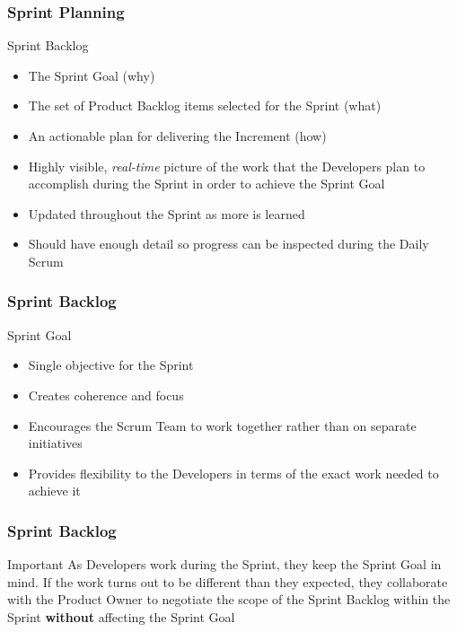 \begin{frame}
    \frametitle{Sprint Planning}
    \begin{block}{Sprint Backlog}
        \begin{itemize}
            \setlength\itemsep{0.7em}
            \item The Sprint Goal (why)
            \item The set of Product Backlog items selected for the Sprint (what)
            \item An actionable plan for delivering the Increment (how)
        \end{itemize}
    \end{block}
     {
        \vspace{0.2em}
        \begin{itemize}
            \setlength\itemsep{0.7em}
            \item Highly visible, \textit{real-time} picture of the work that the Developers plan to accomplish during the Sprint in order to achieve the Sprint Goal
            \item Updated throughout the Sprint as more is learned
            \item Should have enough detail so progress can be inspected during the Daily Scrum
        \end{itemize}
    }
\end{frame}

\begin{frame}
	\frametitle{Sprint Backlog}
	\begin{block}{Sprint Goal}
		\begin{itemize}
			\setlength\itemsep{0.7em}
			\item Single objective for the Sprint
            \item Creates coherence and focus
            \item Encourages the Scrum Team to work together rather than on separate initiatives
            \item Provides flexibility to the Developers in terms of the exact work needed to achieve it
		\end{itemize}
    \end{block}
\end{frame}

\begin{frame}
	\frametitle{Sprint Backlog}
	\begin{alertblock}{Important}
		As Developers work during the Sprint, they keep the Sprint Goal in mind. If the work turns out to be different than they expected, they collaborate with the Product Owner to negotiate the scope of the Sprint Backlog within the Sprint \textbf{without} affecting the Sprint Goal
	\end{alertblock}
\end{frame}


